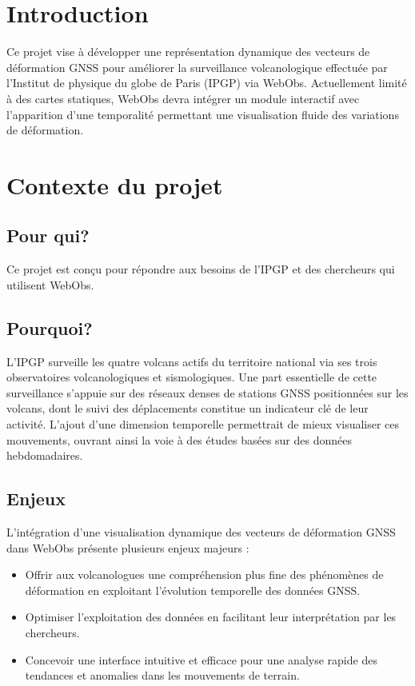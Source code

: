 \documentclass[11pt]{article}
\begin{document}
\date{}


\newpage

\tableofcontents
\newpage

\section{Introduction}
Ce projet vise à développer une représentation dynamique des vecteurs de déformation GNSS pour améliorer la surveillance volcanologique effectuée par l'Institut de physique du globe de Paris (IPGP) via WebObs. Actuellement limité à des cartes statiques, WebObs devra intégrer un module interactif avec l'apparition d'une temporalité permettant une visualisation fluide des variations de déformation. 

\section{Contexte du projet}

\subsection{Pour qui?}
   Ce projet est conçu pour répondre aux besoins de l’IPGP et des chercheurs qui utilisent WebObs. 

\subsection{Pourquoi?}
 L’IPGP surveille les quatre volcans actifs du territoire national via ses trois observatoires volcanologiques et sismologiques. Une part essentielle de cette surveillance s’appuie sur des réseaux denses de stations GNSS positionnées sur les volcans, dont le suivi des déplacements constitue un indicateur clé de leur activité. L’ajout d’une dimension temporelle permettrait de mieux visualiser ces mouvements, ouvrant ainsi la voie à des études basées sur des données hebdomadaires.

\subsection{Enjeux}
    L’intégration d’une visualisation dynamique des vecteurs de déformation GNSS dans WebObs présente plusieurs enjeux majeurs :
    \begin{itemize}
    \item Offrir aux volcanologues une compréhension plus fine des phénomènes de déformation en exploitant l’évolution temporelle des données GNSS.
    \item Optimiser l’exploitation des données en facilitant leur interprétation par les chercheurs.
    \item Concevoir une interface intuitive et efficace pour une analyse rapide des tendances et anomalies dans les mouvements de terrain.
    \end{itemize}
\end{document}
